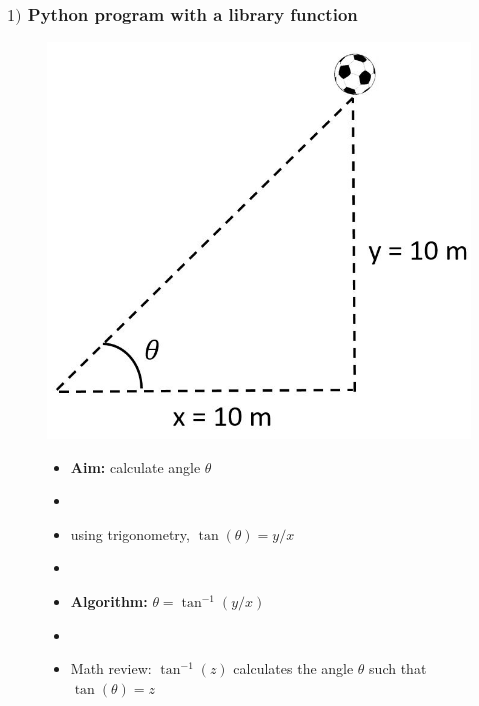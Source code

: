 \documentclass[14pt]{beamer}
\begin{document}
\begin{frame}[fragile]

\frametitle{$1)$ Python program with a library function}

\begin{figure}[ht]
	\centering
	\begin{minipage}{0.4\textwidth}
		\includegraphics[width=\textwidth]{figures/LLp12ball}
	\end{minipage}\hfill
	\begin{minipage}{0.6\textwidth}
		\begin{itemize}
			\item \textbf{Aim:} calculate angle $\theta$
			\item[]
			\item using trigonometry, $\tan(\theta) = y/x$
			\item[]
			\item \textbf{Algorithm:} $\theta = \tan^{-1}(y/x)$
			\item[]
			\item Math review: $\tan^{-1}(z)$ calculates the angle $\theta$ such that $\tan(\theta)=z$
		\end{itemize}
	\end{minipage}
\end{figure}

\end{frame}

\end{document}
